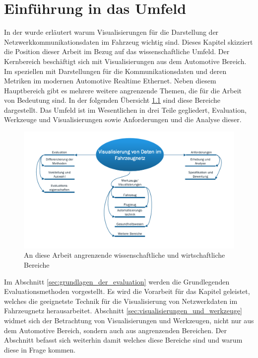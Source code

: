 \documentclass[draft=false
              ,paper=a4
              ,twoside=false
              ,fontsize=11pt
              ,headsepline
              ,BCOR10mm
              ,DIV11
              ]{scrbook}
\begin{document}
\chapter{Einführung in das Umfeld} %
\label{cha:umfeldanalyse}
In der  wurde erläutert warum Visualisierungen für die Darstellung der Netzwerkkommunikationsdaten im Fahrzeug wichtig sind. Dieses Kapitel skizziert die Position dieser Arbeit im Bezug auf das wissenschaftliche Umfeld. Der Kernbereich beschäftigt sich mit Visualisierungen aus dem Automotive Bereich. Im speziellen mit Darstellungen für die Kommunikationsdaten und deren Metriken im modernen Automotive Realtime Ethernet. Neben diesem Hauptbereich gibt es mehrere weitere angrenzende Themen, die für die Arbeit von Bedeutung sind. In der folgenden Übersicht \ref{fig:theme_overview} sind diese Bereiche dargestellt. Das Umfeld ist im Wesentlichen in drei Teile gegliedert, Evaluation, Werkzeuge und Visualisierungen sowie Anforderungen und die Analyse dieser. 

\begin{figure}[htbp]
  \centering
  \includegraphics[width=\textwidth]{img/theme_overview.pdf}
  \caption{An diese Arbeit angrenzende wissenschaftliche und wirtschaftliche Bereiche}
  \label{fig:theme_overview}
\end{figure}

Im Abschnitt \ref{sec:grundlagen_der_evaluation} werden die Grundlegenden Evaluationsmethoden vorgestellt. Es wird die Vorarbeit für das Kapitel  geleistet, welches die geeignetste Technik für die Visualisierung von Netzwerkdaten im Fahrzeugnetz herausarbeitet. Abschnitt \ref{sec:visualisierungen_und_werkzeuge} widmet sich der Betrachtung von Visualisierungen und Werkzeugen, nicht nur aus dem Automotive Bereich, sondern auch aus angrenzenden Bereichen. Der Abschnitt befasst sich weiterhin damit welches diese Bereiche sind und warum diese in Frage kommen. 
%
\end{document}
